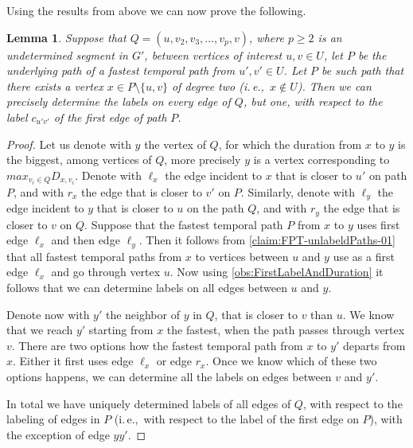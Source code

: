 \documentclass[11pt,a4paper]{article}
\newtheorem{lemma}[theorem]{Lemma}
\theoremstyle{remark}
\theoremstyle{definition}
\newcommand{\ie}{i.\,e.,\ }
\begin{document}
%
Using the results from above we can now prove the following.
\begin{lemma}\label{lem:FPT-DetermineLabelsOnUnlabeledNonFastestPaths}
    Suppose that $Q = (u,v_2,v_3, \dots, v_p, v)$, where $p \geq 2$ is an undetermined segment in $G'$, between vertices of interest $u,v \in U$,
    let $P$ be the underlying path of a fastest temporal path from $u',v' \in U$.
    Let $P$ be such path that there exists a vertex $x \in P \setminus \{u,v\}$ of degree two (\ie $x \notin U$).
    Then we can precisely determine the labels on every edge of $Q$, but one, with respect to the label $c_{u'v'}$ of the first edge of path $P$.
\end{lemma}
\begin{proof}
    Let us denote with $y$ the vertex of $Q$, for which the duration from $x$ to $y$ is the biggest, among vertices of $Q$,
    more precisely $y$ is a vertex corresponding to $max_{v_i \in Q} D_{x,v_i}$.
    Denote 
    with $\ell_x$ the edge incident to $x$ that is closer to $u'$ on path $P$, and with $r_x$ the edge that is closer to $v'$ on $P$.
    Similarly, denote with $\ell_y$ the edge incident to $y$ that is closer to $u$ on the path $Q$, and with $r_y$ the edge that is closer to $v$ on $Q$.
    Suppose that the fastest temporal path $P$ from $x$ to $y$ uses first edge $\ell_x$ and then edge $\ell_y$.
    Then it follows from \cref{claim:FPT-unlabeldPaths-01} that all fastest temporal paths from $x$ to vertices between $u$ and $y$ use as a first edge $\ell_x$ and go through vertex $u$. 
    Now using \cref{obs:FirstLabelAndDuration} it follows that we can determine labels on all edges between $u$ and $y$.

    Denote now with $y'$ the neighbor of $y$ in $Q$, that is closer to $v$ than $u$. 
    We know that we reach $y'$ starting from $x$ the fastest, when the path passes through vertex $v$.
    There are two options how the fastest temporal path from $x$ to $y'$ departs from $x$. Either it first uses edge $\ell_x$ or edge $r_x$. 
    Once we know which of these two options happens, we can determine all the labels on edges between $v$ and $y'$.

    In total we have uniquely determined labels of all edges of $Q$, with respect to the labeling of edges in $P$ (\ie with respect to the label of the first edge on $P$), with the exception of edge $yy'$.
\end{proof}
\end{document}
